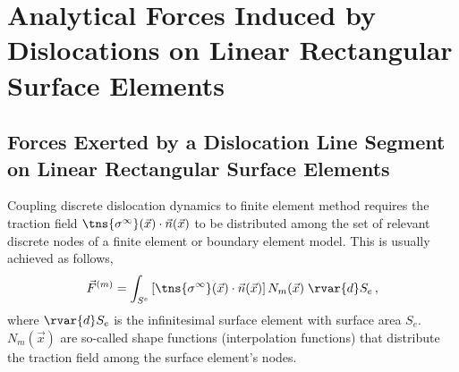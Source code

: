 \chapter{Analytical Forces Induced by Dislocations on Linear Rectangular Surface Elements}
\label{c:lin_rect}
%
\section{Forces Exerted by a Dislocation Line Segment on Linear Rectangular Surface Elements}
\label{s:f_lin_rect}
%
Coupling discrete dislocation dynamics to finite element method requires the traction field $ \tns{\sigma^{\infty}}(\vec{x}) \cdot \vec{n}(\vec{x}) $ to be distributed among the set of relevant discrete nodes of a finite element or boundary element model. This is usually achieved as follows,
\begin{align}\label{eq:ddd_fem_force}
  \vec{F}^{(m)} = \int_{S^{e}} \left[\tns{\sigma^{\infty}}(\vec{x}) \cdot \vec{n}(\vec{x})\right] N_{m}(\vec{x})\; \rvar{d}S_{e}\,,
\end{align}
where $ \rvar{d}S_{e} $ is the infinitesimal surface element with surface area $ S_{e} $. $ N_{m}(\vec{x}) $ are so-called shape functions (interpolation functions) that distribute  the traction field among the surface element's nodes.

